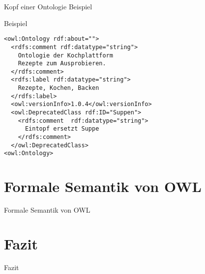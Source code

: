 \documentclass{beamer}
\begin{document}
\begin{frame}[fragile]{Kopf einer Ontologie Beispiel}
\begin{block}{Beispiel}
\begin{lstlisting}[lang="xml"]
<owl:Ontology rdf:about=""> 
  <rdfs:comment rdf:datatype="string">
    Ontologie der Kochplattform 
    Rezepte zum Ausprobieren.		
  </rdfs:comment>
  <rdfs:label rdf:datatype="string">
    Rezepte, Kochen, Backen
  </rdfs:label>
  <owl:versionInfo>1.0.4</owl:versionInfo>
  <owl:DeprecatedClass rdf:ID="Suppen">
    <rdfs:comment  rdf:datatype="string">
      Eintopf ersetzt Suppe
    </rdfs:comment>
  </owl:DeprecatedClass>
<owl:Ontology>
\end{lstlisting}
\end{block}
\end{frame}



\section{Formale Semantik von OWL}

\begin{frame}{Formale Semantik von OWL}
\end{frame}


\section{Fazit}
\begin{frame}{Fazit}
\end{frame}
\end{document}
